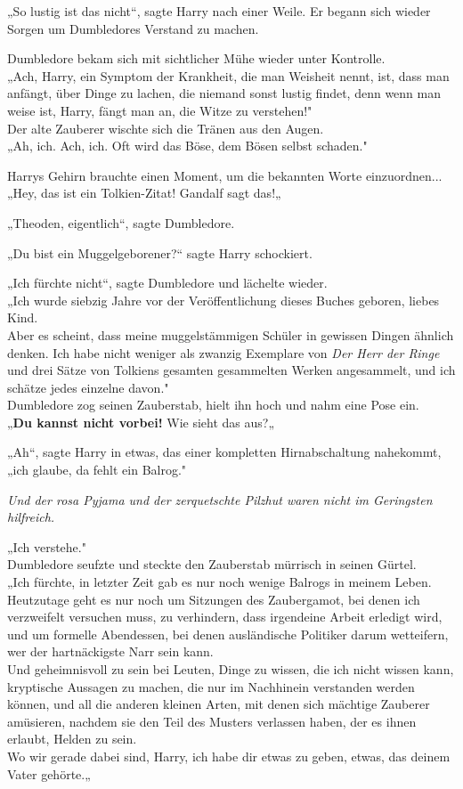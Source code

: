 {„So lustig ist das nicht“, sagte Harry nach einer Weile. Er begann sich wieder Sorgen um Dumbledores Verstand zu machen.

Dumbledore bekam sich mit sichtlicher Mühe wieder unter Kontrolle.\\ „Ach, Harry, ein Symptom der Krankheit, die man Weisheit nennt, ist, dass man anfängt, über Dinge zu lachen, die niemand sonst lustig findet, denn wenn man weise ist, Harry, fängt man an, die Witze zu verstehen!"\\ Der alte Zauberer wischte sich die Tränen aus den Augen.\\ „Ah, ich. Ach, ich. Oft wird das Böse, dem Bösen selbst schaden."

Harrys Gehirn brauchte einen Moment, um die bekannten Worte einzuordnen...\\ „Hey, das ist ein Tolkien-Zitat! Gandalf sagt das!„

„Theoden, eigentlich“, sagte Dumbledore.

„Du bist ein Muggelgeborener?“ sagte Harry schockiert.

„Ich fürchte nicht“, sagte Dumbledore und lächelte wieder.\\ „Ich wurde siebzig Jahre vor der Veröffentlichung dieses Buches geboren, liebes Kind.\\ Aber es scheint, dass meine muggelstämmigen Schüler in gewissen Dingen ähnlich denken. Ich habe nicht weniger als zwanzig Exemplare von \emph{Der Herr der Ringe} und drei Sätze von Tolkiens gesamten gesammelten Werken angesammelt, und ich schätze jedes einzelne davon."\\ Dumbledore zog seinen Zauberstab, hielt ihn hoch und nahm eine Pose ein.\\ „\textbf{Du kannst nicht vorbei!} Wie sieht das aus?„

„Ah“, sagte Harry in etwas, das einer kompletten Hirnabschaltung nahekommt, „ich glaube, da fehlt ein Balrog."

\emph{Und der rosa Pyjama und der zerquetschte Pilzhut waren nicht im Geringsten hilfreich.}

„Ich verstehe."\\ Dumbledore seufzte und steckte den Zauberstab mürrisch in seinen Gürtel.\\ „Ich fürchte, in letzter Zeit gab es nur noch wenige Balrogs in meinem Leben.\\ Heutzutage geht es nur noch um Sitzungen des Zaubergamot, bei denen ich verzweifelt versuchen muss, zu verhindern, dass irgendeine Arbeit erledigt wird, und um formelle Abendessen, bei denen ausländische Politiker darum wetteifern, wer der hartnäckigste Narr sein kann.\\ Und geheimnisvoll zu sein bei Leuten, Dinge zu wissen, die ich nicht wissen kann, kryptische Aussagen zu machen, die nur im Nachhinein verstanden werden können, und all die anderen kleinen Arten, mit denen sich mächtige Zauberer amüsieren, nachdem sie den Teil des Musters verlassen haben, der es ihnen erlaubt, Helden zu sein.\\ Wo wir gerade dabei sind, Harry, ich habe dir etwas zu geben, etwas, das deinem Vater gehörte.„

}
